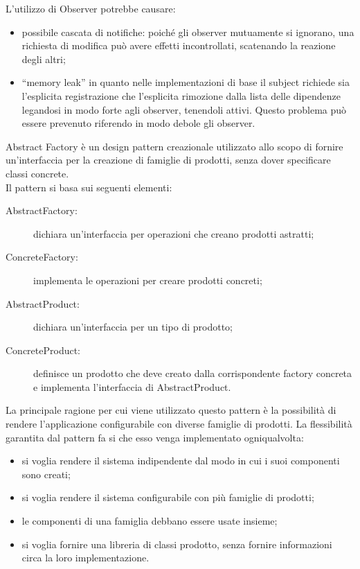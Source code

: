 			L’utilizzo di Observer potrebbe causare:
			\begin{itemize}
			\item possibile cascata di notifiche: poiché gli observer mutuamente si ignorano, una richiesta di modifica può avere effetti incontrollati, scatenando la reazione degli altri;
			\item “memory leak” in quanto nelle implementazioni di base il subject richiede sia l’esplicita registrazione che l’esplicita rimozione dalla lista delle dipendenze legandosi in modo forte agli observer, tenendoli attivi. Questo problema può essere prevenuto riferendo in modo debole gli observer.
			\end{itemize}
 \label{app:abstractfactory}
Abstract Factory è un design pattern creazionale utilizzato allo scopo di fornire un'interfaccia per la creazione di famiglie di prodotti, senza dover specificare classi concrete.\\
Il pattern si basa sui seguenti elementi:
\begin{description}
\item[AbstractFactory:] dichiara un'interfaccia per operazioni che creano prodotti astratti;
\item[ConcreteFactory:] implementa le operazioni per creare prodotti concreti;
\item[AbstractProduct:] dichiara un'interfaccia per un tipo di prodotto;
\item[ConcreteProduct:] definisce un prodotto che deve creato dalla corrispondente factory concreta e implementa l'interfaccia di AbstractProduct.
\end{description}
La principale ragione per cui viene utilizzato questo pattern è la possibilità di rendere l'applicazione configurabile con diverse famiglie di prodotti. La flessibilità garantita dal pattern fa si che esso venga implementato ogniqualvolta:
\begin{itemize}
\item si voglia rendere il sistema indipendente dal modo in cui i suoi componenti sono creati;
\item si voglia rendere il sistema configurabile con più famiglie di prodotti;
\item le componenti di una famiglia debbano essere usate insieme;
\item si voglia fornire una libreria di classi prodotto, senza fornire informazioni circa la loro implementazione.
\end{itemize}
